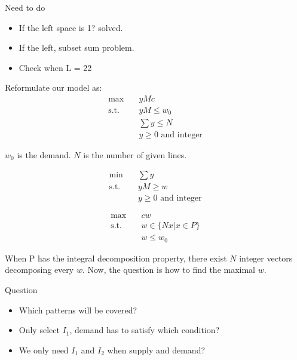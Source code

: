     \begin{frame}{Need to do}
      \begin{itemize}
        \item If the left space is 1? solved.
        \item If the left, subset sum problem.
        \item Check when L = 22
      \end{itemize}

    \end{frame}


    \begin{frame}{}
      Reformulate our model as:
      \[\begin{split}\mbox{max}\quad & yMc \\
      \mbox{s.t.} \quad & yM \leq w_0 \\
      & \sum y \leq N \\
      & y \geq 0 \mbox{ and integer} \end{split}\]

      $w_0$ is the demand. $N$ is the number of given lines.
    \end{frame}

    \begin{frame}{}
      \[\begin{split}\mbox{min}\quad & \sum y \\
      \mbox{s.t.} \quad & yM \geq w \\
      & y \geq 0 \mbox{ and integer}\end{split}\]

      \[\begin{split}\mbox{max}\quad & c w \\
      \mbox{s.t.} \quad & w \in \{Nx| x \in P\} \\
      & w \leq w_0\end{split}\]

      When P has the integral decomposition property, there exist $N$ integer vectors decomposing every $w$.
      Now, the question is how to find the maximal $w$.
    \end{frame}

    \begin{frame}{Question}
      \begin{itemize}
        \item Which patterns will be covered?
        \item Only select $I_1$, demand has to satisfy which condition?
        \item We only need $I_1$ and $I_2$ when supply and demand?
      \end{itemize}
    \end{frame}

